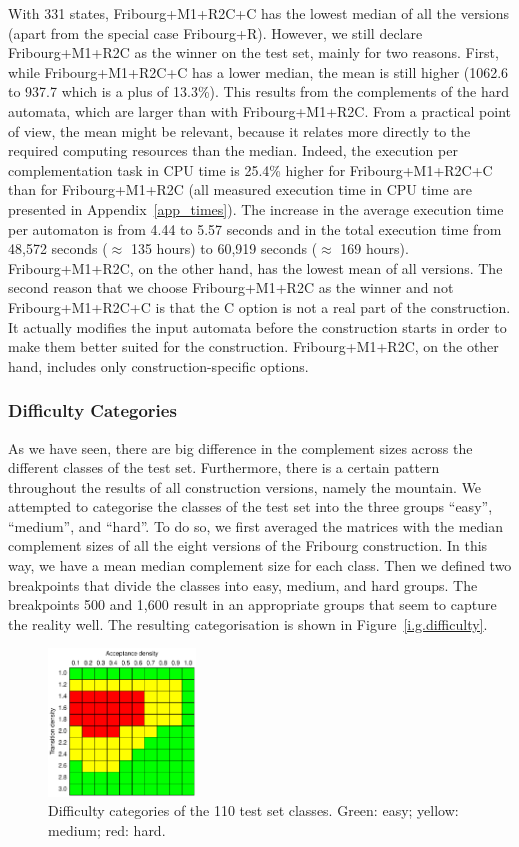 With 331 states, Fribourg+M1+R2C+C has the lowest median of all the versions (apart from the special case Fribourg+R). However, we still declare Fribourg+M1+R2C as the winner on the \goal{} test set, mainly for two reasons. First, while Fribourg+M1+R2C+C has a lower median, the mean is still higher (1062.6 to 937.7 which is a plus of 13.3\%). This results from the complements of the hard automata, which are larger than with Fribourg+M1+R2C. From a practical point of view, the mean might be relevant, because it relates more directly to the required computing resources than the median. Indeed, the execution per complementation task in CPU time is 25.4\% higher for Fribourg+M1+R2C+C than for Fribourg+M1+R2C (all measured execution time in CPU time are presented in Appendix~\ref{app_times}). The increase in the average execution time per automaton is from 4.44 to 5.57 seconds and in the total execution time from 48,572 seconds ($\approx$ 135 hours) to 60,919 seconds ($\approx$ 169 hours). Fribourg+M1+R2C, on the other hand, has the lowest mean of all versions. The second reason that we choose Fribourg+M1+R2C as the winner and not Fribourg+M1+R2C+C is that the C option is not a real part of the construction. It actually modifies the input automata before the construction starts in order to make them better suited for the construction. Fribourg+M1+R2C, on the other hand, includes only construction-specific options.

\subsubsection{Difficulty Categories}
As we have seen, there are big difference in the complement sizes across the different classes of the \goal{} test set. Furthermore, there is a certain pattern throughout the results of all construction versions, namely the mountain. We attempted to categorise the classes of the \goal{} test set into the three groups ``easy'', ``medium'', and ``hard''. To do so, we first averaged the matrices with the median complement sizes of all the eight versions of the Fribourg construction. In this way, we have a mean median complement size for each class. Then we defined two breakpoints that divide the classes into easy, medium, and hard groups. The breakpoints 500 and 1,600 result in an appropriate groups that seem to capture the reality well. The resulting categorisation is shown in Figure~\ref{i.g.difficulty}.

\begin{figure}[ht]
\centering
\includegraphics[width=0.35\textwidth]{figures/r/internal/goal/difficulty.pdf}
\caption{Difficulty categories of the 110 \goal{} test set classes. Green: easy; yellow: medium; red: hard.}
\end{figure}

